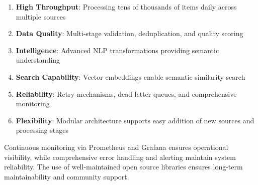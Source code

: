 \documentclass[12pt,a4paper]{report}
\begin{document}
\begin{enumerate}
    \item \textbf{High Throughput}: Processing tens of thousands of items daily across multiple sources
    \item \textbf{Data Quality}: Multi-stage validation, deduplication, and quality scoring
    \item \textbf{Intelligence}: Advanced NLP transformations providing semantic understanding
    \item \textbf{Search Capability}: Vector embeddings enable semantic similarity search
    \item \textbf{Reliability}: Retry mechanisms, dead letter queues, and comprehensive monitoring
    \item \textbf{Flexibility}: Modular architecture supports easy addition of new sources and processing stages
\end{enumerate}

Continuous monitoring via Prometheus and Grafana ensures operational visibility, while comprehensive error handling and alerting maintain system reliability. The use of well-maintained open source libraries ensures long-term maintainability and community support.
\end{document}
